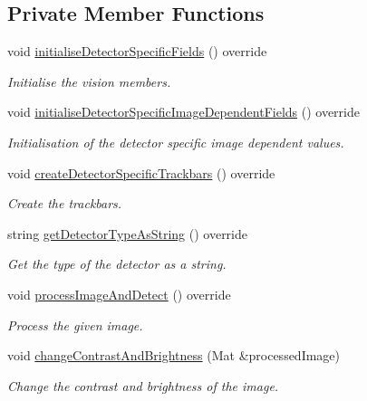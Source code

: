 \subsection*{Private Member Functions}
\begin{DoxyCompactItemize}
\item 
void \hyperlink{classmultiscale_1_1analysis_1_1RegionDetector_aee6bb117ea0ef98b8e333ac33d17962c}{initialise\-Detector\-Specific\-Fields} () override
\begin{DoxyCompactList}\small\item\em Initialise the vision members. \end{DoxyCompactList}\item 
void \hyperlink{classmultiscale_1_1analysis_1_1RegionDetector_afc8382c3838e476b0c7a5a9794ed42e5}{initialise\-Detector\-Specific\-Image\-Dependent\-Fields} () override
\begin{DoxyCompactList}\small\item\em Initialisation of the detector specific image dependent values. \end{DoxyCompactList}\item 
void \hyperlink{classmultiscale_1_1analysis_1_1RegionDetector_a904af350ef7e988bb10970cac7b9491a}{create\-Detector\-Specific\-Trackbars} () override
\begin{DoxyCompactList}\small\item\em Create the trackbars. \end{DoxyCompactList}\item 
string \hyperlink{classmultiscale_1_1analysis_1_1RegionDetector_a3bdfa4df6eb1b2ab36fd490eaae8747c}{get\-Detector\-Type\-As\-String} () override
\begin{DoxyCompactList}\small\item\em Get the type of the detector as a string. \end{DoxyCompactList}\item 
void \hyperlink{classmultiscale_1_1analysis_1_1RegionDetector_ae47319444db34d72d4316f49f965b69d}{process\-Image\-And\-Detect} () override
\begin{DoxyCompactList}\small\item\em Process the given image. \end{DoxyCompactList}\item 
void \hyperlink{classmultiscale_1_1analysis_1_1RegionDetector_a92260dc64fb1de8f72df3a7bd44e171d}{change\-Contrast\-And\-Brightness} (Mat \&processed\-Image)
\begin{DoxyCompactList}\small\item\em Change the contrast and brightness of the image. \end{DoxyCompactList}\item 

\end{DoxyCompactItemize}
